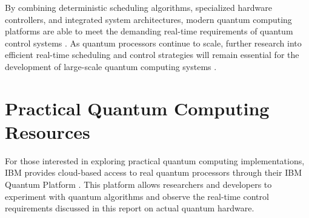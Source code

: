 \documentclass[12pt,a4paper]{article}
\begin{document}
By combining deterministic scheduling algorithms, specialized hardware controllers, and integrated system architectures, modern quantum computing platforms are able to meet the demanding real-time requirements of quantum control systems \cite{Kopetz2011}. As quantum processors continue to scale, further research into efficient real-time scheduling and control strategies will remain essential for the development of large-scale quantum computing systems \cite{QPArch}.
\section*{Practical Quantum Computing Resources}
For those interested in exploring practical quantum computing implementations, IBM provides cloud-based access to real quantum processors through their IBM Quantum Platform \cite{IBMQuantum}. This platform allows researchers and developers to experiment with quantum algorithms and observe the real-time control requirements discussed in this report on actual quantum hardware.


\end{document}
